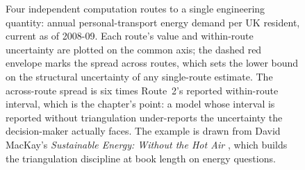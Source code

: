 \begin{figure}[p]
\begin{tikzpicture}[font=\small]
\end{tikzpicture}
\caption[Model triangulation: four routes to UK personal-transport
energy demand]{Four independent computation routes to a single
engineering quantity: annual personal-transport energy demand per
UK resident, current as of 2008-09. Each route's value and within-route
uncertainty are plotted on the common axis; the dashed red envelope
marks the spread across routes, which sets the lower bound on the
structural uncertainty of any single-route estimate. The across-route
spread is six times Route~2's reported within-route interval, which is
the chapter's point: a model whose interval is reported without
triangulation under-reports the uncertainty the decision-maker
actually faces. The example is drawn from David MacKay's
\emph{Sustainable Energy: Without the Hot Air}
\cite{gen:mackay2009}, which builds the triangulation discipline at
book length on energy questions.}
\label{fig:vol02:ch18:triangulation}
\end{figure}
